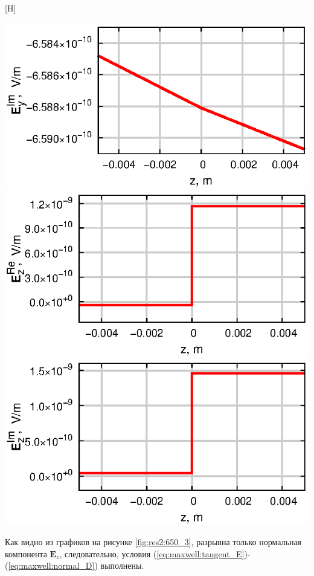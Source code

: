 \documentclass[a4paper,14pt]{article}
\makeatletter
\renewenvironment{figure}[1][\fps@figure]{
  \edef\@tempa{\noexpand\@float{figure}[#1]}
  \@tempa
  \addtocounter{foofigure}{1}
}{
  \end@float
}
\makeatother
\begin{document}
\begin{figure}[H]
	\includegraphics[scale=1]{research-2/650/EyI.eps}
	\includegraphics[scale=1]{research-2/650/EzR.eps}
	\includegraphics[scale=1]{research-2/650/EzI.eps}
	\caption{графики компонент электрического поля на контактных границах}
	\label{fig:res2:650_3}
\end{figure}

Как видно из графиков на рисунке \ref{fig:res2:650_3}, разрывна только нормальная компонента $\mathbf{E}_z$, следовательно, условия (\ref{eq:maxwell:tangent_E})-(\ref{eq:maxwell:normal_D}) выполнены.
\end{document}
